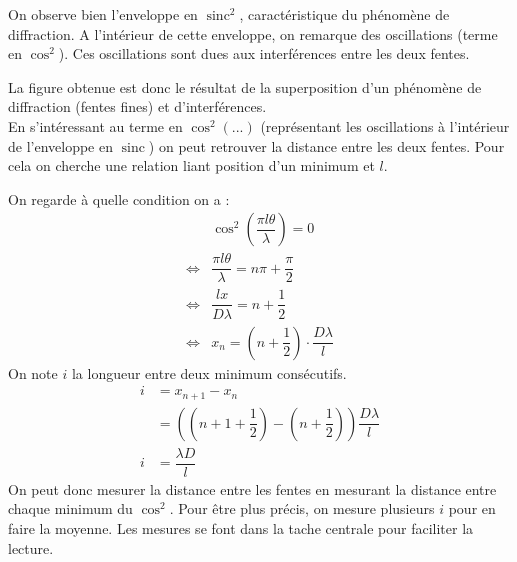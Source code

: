 \documentclass[12pt,a4paper]{article}
\DeclareMathOperator{\sinc}{sinc}
\begin{document}
	On observe bien l'enveloppe en $\sinc^2$, caractéristique du phénomène de diffraction. A l'intérieur de cette enveloppe, on remarque des oscillations (terme en $\cos^2$). Ces oscillations sont dues aux interférences entre les deux fentes.
	
	La figure obtenue est donc le résultat de la superposition d'un phénomène de diffraction (fentes fines) et d'interférences.\\
	
	En s'intéressant au terme en $\cos^2(...)$ (représentant les oscillations à l'intérieur de l'enveloppe en $\sinc$) on peut retrouver la distance entre les deux fentes. Pour cela on cherche une relation liant position d'un minimum et $l$.
	
	On regarde à quelle condition on a :
	\begin{align*}
	&\cos^2\left(\dfrac{\pi l \theta}{\lambda}\right)=0\\
	\iff& \dfrac{\pi l \theta}{\lambda}=n \pi+\dfrac{\pi}{2}\\
	\iff& \dfrac{l x}{D\lambda}=n+\dfrac{1}{2}\\
	\iff& x_n=(n+\dfrac{1}{2})\cdot\dfrac{D\lambda}{l}
	\end{align*}
	On note $i$ la longueur entre deux minimum consécutifs.
	\begin{align*}
	i&=x_{n+1}-x_{n}\\
	&=((n+1+\dfrac{1}{2})-(n+\dfrac{1}{2}))\dfrac{D\lambda}{l}\\
	i&=\dfrac{\lambda D}{l}
	\end{align*}
	On peut donc mesurer la distance entre les fentes en mesurant la distance entre chaque minimum du $\cos^2$. Pour être plus précis, on mesure plusieurs $i$ pour en faire la moyenne. Les mesures se font dans la tache centrale pour faciliter la lecture. 
	\vspace*{+1em}
\end{document}
